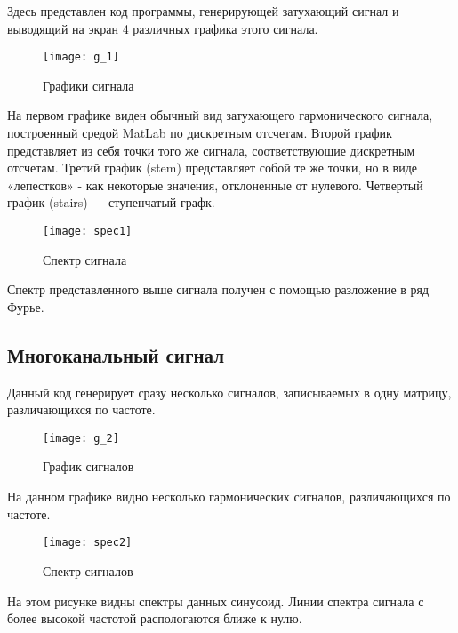 
\parindent=1cm
Здесь представлен код программы, генерирующей затухающий сигнал и выводящий на экран 4 различных графика этого сигнала.

\begin{figure}[H]
	\begin{center}
		\texttt{[image: g\_1]}
		\caption{Графики сигнала} 
		\label{pic:g_1} %
	\end{center}
\end{figure}
На первом графике виден обычный вид затухающего гармонического сигнала, построенный средой MatLab по дискретным отсчетам. Второй график представляет из себя точки того же сигнала, соответствующие дискретным отсчетам. Третий график (stem) представляет собой те же точки, но в виде «лепестков» - как некоторые значения, отклоненные от нулевого. Четвертый график (stairs) — ступенчатый графк.

\begin{figure}[H]
	\begin{center}
		\texttt{[image: spec1]}
		\caption{Спектр сигнала} 
		\label{pic:spec1} %
	\end{center}
\end{figure}
Спектр представленного выше сигнала получен с помощью разложение в ряд Фурье.

\subsection{Многоканальный сигнал}


\parindent=1cm
Данный код генерирует сразу несколько сигналов, записываемых в одну матрицу, различающихся по частоте.

\begin{figure}[H]
	\begin{center}
		\texttt{[image: g\_2]}
		\caption{График сигналов} 
		\label{pic:g_2} %
	\end{center}
\end{figure}
На данном графике видно несколько гармонических сигналов, различающихся по частоте.

\begin{figure}[H]
	\begin{center}
		\texttt{[image: spec2]}
		\caption{Спектр сигналов} 
		\label{pic:spec2} %
	\end{center}
\end{figure}
На этом рисунке видны спектры данных синусоид. Линии спектра сигнала с более высокой частотой распологаются ближе к нулю.

